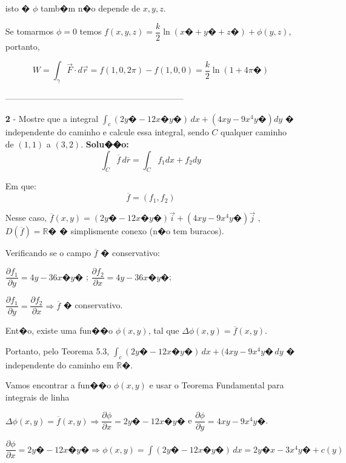 \documentclass[12pt]{article}
\newcommand{\integral}{\displaystyle\int}
\begin{document}
\begin{enumerate}
          isto � $\phi$ tamb�m n�o depende de $x,y,z$.

          \begin{center}
              Se tomarmos $\phi = 0$ temos $f(x,y,z)=\dfrac{k}{2} \ln(x�+y�+z�)+ \phi (y,z)$, portanto,
          \end{center}

          $$W=\integral_\gamma \vec{F}\cdot d\vec{r}=f(1,0,2\pi)-f(1,0,0)=\dfrac{k}{2}\ln(1+4\pi�)$$
          \begin{center}
              ---------------------------------------------------------------
          \end{center}
    \item[\textbf{2}]- Mostre que a integral $\int_c (2y�-12x�y�)\,dx +(4xy-9x^4y�)dy$ � independente do caminho e calcule essa integral, sendo $C$ qualquer caminho de $(1,1)$ a $(3,2)$.
          \doublespacing
          \textbf{Solu��o:}
          $$\int_C \overline{f} \,d \overline{r}=\int_C f_1dx + f_2dy$$


          Em que:$$\overline{f}=(f_1,f_2)$$

          Nesse caso, $\overline{f}(x,y)=(2y�-12x�y�)\vec{i}+(4xy-9x^4y�)\vec{j}$ , $D(\overline{f})=\mathbb{R}�$ � simplismente conexo (n�o tem buracos).

          Verificando se o campo $\overline{f}$ � conservativo:
          \begin{center}
              $\dfrac{\partial f_1}{\partial y} = 4y - 36x�y� $ ; $\dfrac{\partial f_2}{\partial x} = 4y - 36x�y� $;

              $\dfrac{\partial f_1}{\partial y} = \dfrac{\partial f_2}{\partial x} \Rightarrow \overline{f} $ � conservativo.
              \singlespacing
          \end{center}
          Ent�o, existe uma fun��o $\phi(x,y)$, tal que $\Delta \phi(x,y) = \overline{f}(x,y)$.

          Portanto, pelo Teorema 5.3, $\int_c (2y�-12x�y�)\,dx + (4xy - 9x^4y� \,dy$ � independente do caminho em $\mathbb{R}�$.

          Vamos encontrar a fun��o $\phi(x,y)$ e usar o Teorema Fundamental para integrais de linha

          \doublespacing
          $\Delta \phi(x,y)=\overline{f}(x,y) \Rightarrow \dfrac{\partial \phi}{\partial x} = 2y�-12x�y�$  e  $\dfrac{\partial \phi}{\partial y} = 4xy - 9x^4y�$.


          $\dfrac{\partial \phi}{\partial x} = 2y� - 12x�y� \Rightarrow \phi(x,y) = \int (2y�-12x�y�)\,dx
              = 2y�x - 3x^4y� + c(y)$


\end{enumerate}
\end{document}
